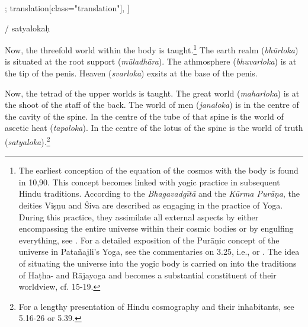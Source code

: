 \begin{alignment}[
  texts=edition[class="edition"];
  translation[class="translation"],
  ]
\begin{edition}
\begin{prose}[p34_01]
\label{gapn1n2start}
/ 
 satyalokaḥ\dd{}
    \end{prose}
  \end{edition}
  \begin{translation}
\begin{tlate}[p33_01]
  \noindent
Now, the threefold world within the body is taught.\footnote{The earliest conception of the equation of the cosmos with the body is found in  10,90. This concept becomes linked with yogic practice in subsequent Hindu traditions. According to the \textit{Bhagavadgītā} and the \textit{Kūrma Purāṇa}, the deities Viṣṇu and Śiva are described as engaging in the practice of Yoga. During this practice, they assimilate all external aspects by either encompassing the entire universe within their cosmic bodies or by engulfing everything, see \citeauthor[2011:88]{white2011}. For a detailed exposition of the Purāṇic concept of the universe in Patañajli's Yoga, see the commentaries on  3.25, i.e., \citeauthor[1983: 297-304]{aranya} or \citeauthor[2009:353-356]{bryant2009}. The idea of situating the universe into the yogic body is carried on into the traditions of Haṭha- and Rājayoga and becomes a substantial constituent of their worldview, cf.  15-19.} The earth realm (\textit{bhūrloka}) is situated at the root support (\textit{mūladhāra}). The athmosphere (\textit{bhuvarloka}) is at the tip of the penis. Heaven (\textit{svarloka}) exsits at the base of the penis.
\end{tlate}
\begin{tlate}[p34_01]
Now, the tetrad of the upper worlds is taught. The great world (\textit{maharloka}) is at the shoot of the staff of the back. The world of men (\textit{janaloka}) is in the centre of the cavity of the spine. In the centre of the tube of that spine is the world of ascetic heat (\textit{tapoloka}). In the centre of the lotus of the spine is the world of truth (\textit{satyaloka}).\footnote{For a lengthy presentation of Hindu cosmography and their inhabitants, see  5.16-26 or  5.39.}
\flushpage 
\end{tlate}
  \end{translation}
\end{alignment}
